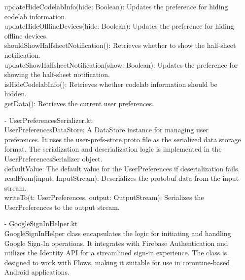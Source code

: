 \begin{enumerate}
            updateHideCodelabInfo(hide: Boolean): Updates the preference for hiding codelab information.\\
            updateHideOfflineDevices(hide: Boolean): Updates the preference for hiding offline devices.\\
            shouldShowHalfsheetNotification(): Retrieves whether to show the half-sheet notification.\\
            updateShowHalfsheetNotification(show: Boolean): Updates the preference for showing the half-sheet notification.\\
            isHideCodelabInfo(): Retrieves whether codelab information should be hidden.\\
            getData(): Retrieves the current user preferences.\\
      \item[-] UserPreferencesSerializer.kt\\
            UserPreferencesDataStore: A DataStore instance for managing user preferences.
            It uses the user-prefs-store.proto file as the serialized data storage format.
            The serialization and deserialization logic is implemented in the UserPreferencesSerializer object.\\
            defaultValue: The default value for the UserPreferences if deserialization fails.\\
            readFrom(input: InputStream): Deserializes the protobuf data from the input stream.\\
            writeTo(t: UserPreferences, output: OutputStream): Serializes the UserPreferences to the output stream.\\
      \item[-] GoogleSignInHelper.kt\\
            GoogleSignInHelper class encapsulates the logic for initiating and handling Google Sign-In operations. It integrates with Firebase Authentication and utilizes the Identity API for a streamlined sign-in experience. The class is designed to work with Flows, making it suitable for use in coroutine-based Android applications.\\

\end{enumerate}